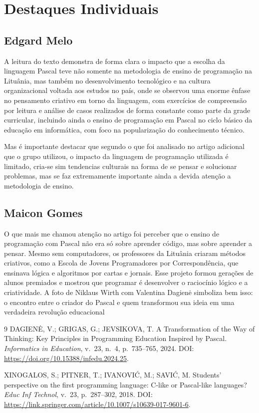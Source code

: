 \documentclass[12pt,a4paper,oneside]{abntex2}
\begin{document}
\chapter{Destaques Individuais}

\section{Edgard Melo}

A leitura do texto demonstra de forma clara o impacto que a escolha da linguagem Pascal teve não somente na metodologia de ensino de programação na Lituânia, mas também no desenvolvimento tecnológico e na cultura organizacional voltada aos estudos no país, onde se observou uma enorme ênfase no pensamento criativo em torno da linguagem, com exercícios de compreensão por leitura e análise de casos realizados de forma constante como parte da grade curricular, incluindo ainda o ensino de programação em Pascal no ciclo básico da educação em informática, com foco na popularização do conhecimento técnico.

Mas é importante destacar que segundo o que foi analisado no artigo adicional que o grupo utilizou, o impacto da linguagem de programação utilizada é limitado, cria-se sim tendencias culturais na forma de se pensar e solucionar problemas, mas se faz extremamente importante ainda a devida atenção a metodologia de ensino.

\section{Maicon Gomes}
O que mais me chamou atenção no artigo foi perceber que o ensino de programação com Pascal não era só sobre aprender código, mas sobre aprender a pensar.
Mesmo sem computadores, os professores da Lituânia criaram métodos criativos, como a Escola de Jovens Programadores por Correspondência, que ensinava lógica e algoritmos por cartas e jornais.
Esse projeto formou gerações de alunos premiados e mostrou que programar é desenvolver o raciocínio lógico e a criatividade.
A foto de Niklaus Wirth com Valentina Dagienė simboliza bem isso: o encontro entre o criador do Pascal e quem transformou sua ideia em uma verdadeira revolução educacional

\postextual

\begin{thebibliography}{9}
DAGIENĖ, V.; GRIGAS, G.; JEVSIKOVA, T. A Transformation of the Way of Thinking: Key Principles in Programming Education Inspired by Pascal. \textit{Informatics in Education}, v.~23, n.~4, p.~735--765, 2024. DOI: \url{https://doi.org/10.15388/infedu.2024.25}.

XINOGALOS, S.; PITNER, T.; IVANOVIĆ, M.; SAVIĆ, M. Students’ perspective on the first programming language: C-like or Pascal-like languages? \textit{Educ Inf Technol}, v.~23, p.~287--302, 2018. DOI: \url{https://link.springer.com/article/10.1007/s10639-017-9601-6}.

\end{thebibliography}
\end{document}
